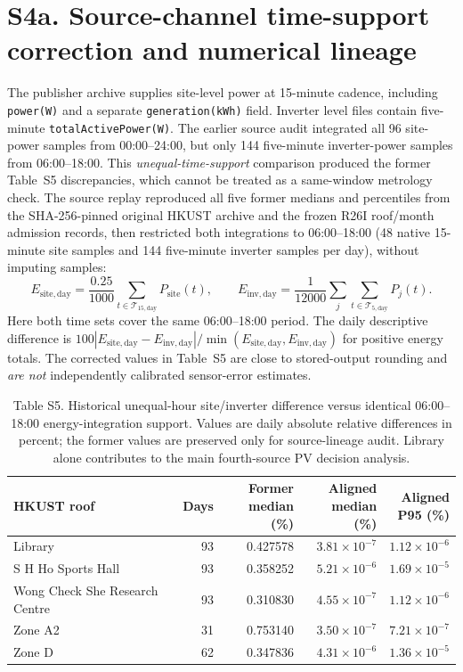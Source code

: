 \documentclass[11pt]{article}
\begin{document}
\section*{S4a. Source-channel time-support correction and numerical lineage}
The publisher archive supplies site-level power at 15-minute cadence, including \texttt{power(W)} and a separate \texttt{generation(kWh)} field. Inverter level files contain five-minute \texttt{totalActivePower(W)}. The earlier source audit integrated all 96 site-power samples from 00:00--24:00, but only 144 five-minute inverter-power samples from 06:00--18:00. This \emph{unequal-time-support} comparison produced the former Table~S5 discrepancies, which cannot be treated as a same-window metrology check. The source replay reproduced all five former medians and percentiles from the SHA-256-pinned original HKUST archive and the frozen R26I roof/month admission records, then restricted both integrations to 06:00--18:00 (48 native 15-minute site samples and 144 five-minute inverter samples per day), without imputing samples:
\[
E_{\mathrm{site,day}}=\frac{0.25}{1000}\sum_{t\in\mathcal{T}_{15,\mathrm{day}}}P_{\mathrm{site}}(t),\qquad
E_{\mathrm{inv,day}}=\frac{1}{12000}\sum_j\sum_{t\in\mathcal{T}_{5,\mathrm{day}}}P_j(t).
\]
Here both time sets cover the same 06:00--18:00 period. The daily descriptive difference is $100|E_{\mathrm{site,day}}-E_{\mathrm{inv,day}}|/\min(E_{\mathrm{site,day}},E_{\mathrm{inv,day}})$ for positive energy totals. The corrected values in Table~S5 are close to stored-output rounding and \emph{are not} independently calibrated sensor-error estimates.

\begin{table}[htbp]
\centering
\caption*{Table S5. Historical unequal-hour site/inverter difference versus identical 06:00--18:00 energy-integration support. Values are daily absolute relative differences in percent; the former values are preserved only for source-lineage audit. Library alone contributes to the main fourth-source PV decision analysis.}
\small
\setlength{\tabcolsep}{5.0pt}
\begin{tabular}{@{}p{5.9cm}r r r r@{}}
\toprule
HKUST roof & Days & \shortstack{Former\\median (\%)} & \shortstack{Aligned\\median (\%)} & \shortstack{Aligned\\P95 (\%)} \\
\midrule
Library & 93 & 0.427578 & $3.81\times10^{-7}$ & $1.12\times10^{-6}$ \\
S H Ho Sports Hall & 93 & 0.358252 & $5.21\times10^{-6}$ & $1.69\times10^{-5}$ \\
Wong Check She Research Centre & 93 & 0.310830 & $4.55\times10^{-7}$ & $1.12\times10^{-6}$ \\
Zone A2 & 31 & 0.753140 & $3.50\times10^{-7}$ & $7.21\times10^{-7}$ \\
Zone D & 62 & 0.347836 & $4.31\times10^{-6}$ & $1.36\times10^{-5}$ \\
\bottomrule
\end{tabular}
\end{table}
\end{document}
